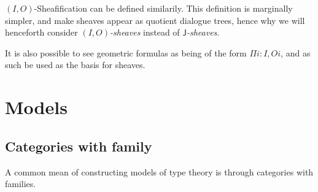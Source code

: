 \documentclass[11pt]{article}
\newcommand{\0}{\mathbf{0}}
\newcommand{\1}{\mathbf{1}}
\begin{document}
$(I,O)$-Sheafification can be defined similarily. This definition is marginally simpler, and make sheaves appear as quotient dialogue trees, hence why we will henceforth consider \emph{$(I,O)$-sheaves} instead of \emph{$\mathsf{J}$-sheaves}.

It is also possible to see geometric formulas as being of the form $\Pi i : I, O i$, and as such be used as the basis for sheaves.

\section{Models}\label{Models}

\subsection{Categories with family}

A common mean of constructing models of type theory is through categories with families.
\end{document}
